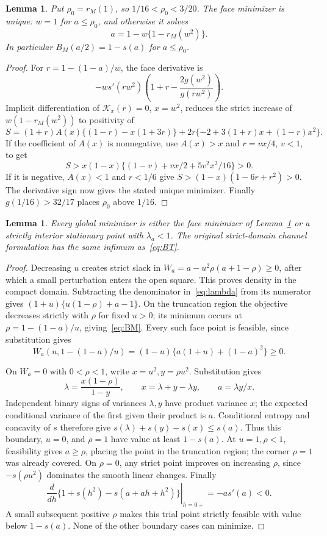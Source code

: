 \documentclass[12pt,letterpaper,onecolumn]{article}
\newtheorem{lemma}[theorem]{Lemma}
\theoremstyle{definition}
\begin{document}
\begin{lemma}\label{lem:face}
Put \(\rho_0=r_M(1)\), so \(1/16<\rho_0<3/20\).
The face minimizer is unique: \(w=1\) for \(a\le\rho_0\), and otherwise it solves
\[
a=1-w\{1-r_M(w^2)\}.
\]
In particular \(B_M(a/2)=1-s(a)\) for \(a\le\rho_0\).
\end{lemma}
\begin{proof}
For \(r=1-(1-a)/w\), the face derivative is
\[
-ws'(rw^2)\left(1+r-\frac{2g(w^2)}{g(rw^2)}\right).
\]
Implicit differentiation of \(\mathcal K_x(r)=0\), \(x=w^2\), reduces the strict increase of \(w(1-r_M(w^2))\) to positivity of
\[
S=(1+r)A(x)\{(1-r)-x(1+3r)\}
+2r\{-2+3(1+r)x+(1-r)x^2\}.
\]
If the coefficient of \(A(x)\) is nonnegative, use \(A(x)>x\) and \(r=vx/4\), \(v<1\), to get
\[
S>x(1-x)\{(1-v)+vx/2+5v^2x^2/16\}>0.
\]
If it is negative, \(A(x)<1\) and \(r<1/6\) give
\(S>(1-x)(1-6r+r^2)>0\).
The derivative sign now gives the stated unique minimizer. Finally \(g(1/16)>32/17\) places \(\rho_0\) above \(1/16\).
\end{proof}

\begin{lemma}\label{lem:candidates}
Every global minimizer is either the face minimizer of Lemma~\ref{lem:face} or a strictly interior stationary point with \(\lambda_a<1\). The original strict-domain channel formulation has the same infimum as~\eqref{eq:BT}.
\end{lemma}
\begin{proof}
Decreasing \(u\) creates strict slack in
\(W_a=a-u^2\rho(a+1-\rho)\ge0\), after which a small perturbation enters the open square. This proves density in the compact domain.
Subtracting the denominator in~\eqref{eq:lambda} from its numerator gives
\((1+u)\{u(1-\rho)+a-1\}\).
On the truncation region the objective decreases strictly with \(\rho\) for fixed \(u>0\); its minimum occurs at
\(\rho=1-(1-a)/u\), giving~\eqref{eq:BM}.
Every such face point is feasible, since substitution gives
\[
W_a(u,1-(1-a)/u)=(1-u)\{a(1+u)+(1-a)^2\}\ge0.
\]

On \(W_a=0\) with \(0<\rho<1\), write \(x=u^2,y=\rho u^2\). Substitution gives
\[
\lambda=\frac{x(1-\rho)}{1-y},\qquad
x=\lambda+y-\lambda y,\qquad a=\lambda y/x.
\]
Independent binary signs of variances \(\lambda,y\) have product variance \(x\); the expected conditional variance of the first given their product is \(a\).
Conditional entropy and concavity of \(s\) therefore give
\(s(\lambda)+s(y)-s(x)\le s(a)\).
Thus this boundary, \(u=0\), and \(\rho=1\) have value at least \(1-s(a)\).
At \(u=1,\rho<1\), feasibility gives \(a\ge\rho\), placing the point in the truncation region; the corner \(\rho=1\) was already covered.
On \(\rho=0\), any strict point improves on increasing \(\rho\), since
\(-s(\rho u^2)\) dominates the smooth linear changes.
Finally
\[
\left.\frac{d}{dh}\{1+s(h^2)-s(a+ah+h^2)\}\right|_{h=0+}
=-as'(a)<0.
\]
A small subsequent positive \(\rho\) makes this trial point strictly feasible with value below \(1-s(a)\). None of the other boundary cases can minimize.
\end{proof}
\end{document}
